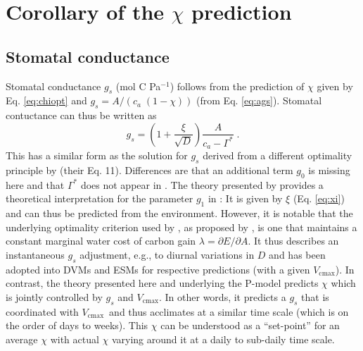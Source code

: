 \documentclass[gmd, manuscript]{copernicus}
\newcommand{\vcmax}{$V_{\text{cmax}}$}
\begin{document}
\section{Corollary of the $\chi$ prediction}
\label{sec:corollary}

\subsection{Stomatal conductance}
\label{sec:gs}
Stomatal conductance $g_s$ (mol C Pa$^{-1}$) follows from the prediction of $\chi$ given by Eq. \ref{eq:chiopt} and $g_s = A / ( c_a\;(1-\chi) )$ (from Eq. \ref{eq:ags}). Stomatal contuctance can thus be written as
\begin{equation}
\label{eq:gs}
    g_s = \left( 1 + \frac{\xi}{\sqrt{D}} \right) \frac{A}{c_a - \Gamma^\ast}\;.
\end{equation}
This has a similar form as the solution for $g_s$ derived from a different optimality principle by \citet{medlyn11gcb} (their Eq. 11). Differences are that an additional term $g_0$ is missing here and that $\Gamma^\ast$ does not appear in \citet{medlyn11gcb}. The theory presented by \citet{prentice14ecollett} provides a theoretical interpretation for the parameter $g_1$ in \citet{medlyn11gcb}: It is given by $\xi$ (Eq. \ref{eq:xi}) and can thus be predicted from the environment. However, it is notable that the underlying optimality criterion used by \citet{medlyn11gcb}, as proposed by \citet{Cowan1977-ud}, is one that maintains a constant marginal water cost of carbon gain $\lambda = \partial E / \partial A$. It thus describes an instantaneous $g_s$ adjustment, e.g., to diurnal variations in $D$ and has been adopted into DVMs and ESMs for respective predictions (with a given \vcmax ). In contrast, the theory presented here and underlying the P-model predicts $\chi$ which is jointly controlled by $g_s$ and \vcmax . In other words, it predicts a $g_s$ that is coordinated with \vcmax\ and thus acclimates at a similar time scale (which is on the order of days to weeks). This $\chi$ can be understood as a ``set-point'' for an average $\chi$ with actual $\chi$ varying around it at a daily to sub-daily time scale.

\end{document}
